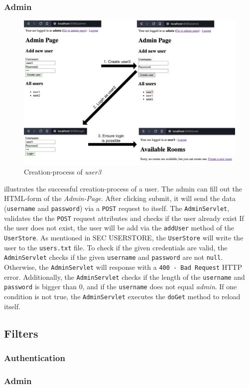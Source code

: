 \subsubsection{Admin}\label{subsubsec:03_impl_servlets_admin}
\begin{figure}[h]
\centering
\includegraphics[scale=0.2]{images/03_impl/admin/create_user_all}
\caption{Creation-process of \textit{user3}}
\label{fig:03_impl_servlets_room_createall}
\end{figure}
 illustrates the successful creation-process of a user.
The admin can fill out the HTML-form of the \textit{Admin-Page}. After clicking submit, it will send the data (\texttt{username} and \texttt{password}) via a \texttt{POST} request to itself.
The \texttt{AdminServlet}, validates the the \texttt{POST} request attributes and checks if the user already exist If the user does not exist, the user will be add via the \texttt{addUser} method of the \texttt{UserStore}. As mentioned in SEC USERSTORE, the \texttt{UserStore} will write the user to the \texttt{users.txt} file.
To check if the given credentials are valid, the \texttt{AdminServlet} checks if the given \texttt{username} and \texttt{password} are not \texttt{null}. Otherwise, the \texttt{AdminServlet} will response with a \texttt{400 - Bad Request} HTTP error. Additionally, the \texttt{AdminServlet} checks if the length of the \texttt{username} and \texttt{password} is bigger than 0, and if the \texttt{username} does not equal \textit{admin}. If one condition is not true, the \texttt{AdminServlet} executes the \texttt{doGet} method to reload itself.



\subsection{Filters}\label{subsec:03_impl_filters}

\subsubsection{Authentication}\label{subsubsec:03_impl_filters_auth}

\subsubsection{Admin}\label{subsubsec:03_impl_filters_admin}

